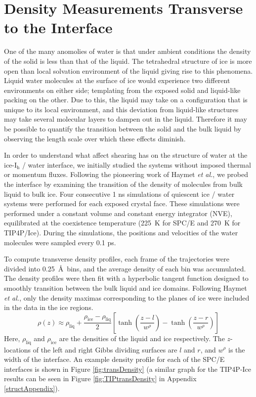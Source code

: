 \section{Density Measurements Transverse to the Interface}
One of the many anomolies of water is that under ambient conditions
the density of the solid is less than that of the liquid. The
tetrahedral structure of ice is more open than local solvation
environment of the liquid giving rise to this phenomena. Liquid water
molecules at the surface of ice would experience two different
environments on either side; templating from the exposed solid and
liquid-like packing on the other. Due to this, the liquid may take on
a configuration that is unique to its local environment, and this
deviation from liquid-like structures may take several molecular
layers to dampen out in the liquid. Therefore it may be possible to
quantify the transition between the solid and the bulk liquid by
observing the length scale over which these effects diminish.

In order to understand what affect shearing has on the structure of
water at the ice-I$_\mathrm{h}$ / water interface, we initially
studied the systems without imposed thermal or momentum
fluxes. Following the pioneering work of Haymet \textit{et al.}, we
probed the interface by examining the transition of the density of
molecules from bulk liquid to bulk
ice.\cite{Karim1987,Karim1990,Hayward2001,Bryk2004} Four consecutive 1
ns simulations of quiescent ice / water systems were performed for
each exposed crystal face. These simulations were performed under a
constant volume and constant energy integrator (NVE), equilibrated at
the coexistence temperature (225~K for SPC/E and 270~K for
TIP4P/Ice). During the simulations, the positions and velocities of
the water molecules were sampled every 0.1 ps.

To compute transverse density profiles, each frame of the trajectories
were divided into 0.25~\AA~bins, and the average density of each bin
was accumulated. The density profiles were then fit with a hyperbolic
tangent function designed to smoothly transition between the bulk
liquid and ice domains. Following Haymet \textit{et al.}, only the
density maximas corresponding to the planes of ice were included in
the data in the ice regions.
\begin{equation}\label{rho_fit}
\rho (z) \approx
\rho_\mathrm{liq}+\frac{\rho_\mathrm{ice}-\rho_\mathrm{liq}}{2}\left[\tanh\left(\frac{z-l}{w^\rho}\right)-\tanh\left(\frac{z-r}{w^\rho}\right)\right]
\end{equation}
Here, $\rho_\mathrm{liq}$ and $\rho_\mathrm{ice}$ are the densities of
the liquid and ice respectively. The $z$-locations of the left and
right Gibbs dividing surfaces are $l$ and $r$, and $w^\rho$ is the
width of the interface. An example density profile for each of the
SPC/E interfaces is shown in Figure \ref{fig:transDensity} (a similar
graph for the TIP4P-Ice results can be seen in Figure
\ref{fig:TIPtransDensity} in Appendix \ref{structAppendix}).

